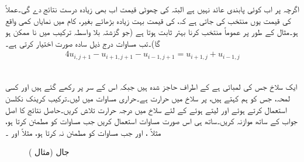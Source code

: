 اگرچہ  پر اب  کوئی پابندی عائد نہیں ہے  البتہ  کی چھوٹی قیمت اب بھی  زیادہ درست نتائج دے گی۔عملاً  کی قیمت یوں منتخب کی جاتی ہے کہ،  کی قیمت بہت زیادہ بڑھائے بغیر، کام میں نمایاں کمی واقع ہو۔مثال کے طور پر عموماً  منتخب کرنا بہتر ثابت ہوتا ہے (جو گزشتہ بلا واسطہ ترکیب میں نا ممکن ہو گا)۔تب مساوات  درج ذیل سادہ صورت اختیار کرتی ہے۔
\begin{align}\label{مساوات_اعدادی_کرینک_نکلسن_ب}
4u_{i,j+1}-u_{i+1,j+1}-u_{i-1,j+1}=u_{i+1,j}+u_{i-1,j}
\end{align}

\quad {}\\
ایک سلاخ جس کی لمبائی  ہے کے  اطراف حاجز شدہ ہیں جبکہ اس کے سر   پر رکھے گئے ہیں اور  کسی لمحہ، جس کو ہم  کہتے ہیں، پر سلاخ میں حرارت  ہے۔حراری مساوات میں  لیں۔ترکیب کرینک نکلسن استعمال کرتے ہوئے  اور  لیتے ہوئے  کے لئے سلاخ میں درجہ حرارت  تلاش کریں۔حاصل نتائج کا اصل جواب کے ساتھ موازنہ کریں۔ساتھ ہی اس صورت مساوات  استعمال کریں جب  مساوات  کو مطمئن کرتا ہو، مثلاً ، اور جب   مساوات  کو مطمئن نہ کرتا ہو، مثلاً  اور ۔
\begin{figure}
\centering
{}
\caption{جال (مثال )}
\label{شکل_مثال_اعدادی_کرینک_نکلسن}
\end{figure}

